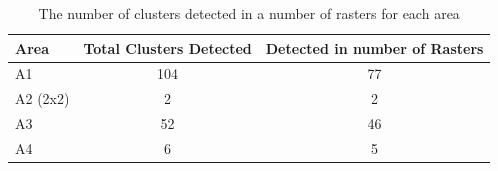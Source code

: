 

\begin{table}[H]
    \centering
    \begin{tabular}{l c c }
        \toprule
        Area     & Total Clusters Detected & Detected in number of Rasters \\
        \midrule
        A1       & 104                     & 77                            \\
        A2 (2x2) & 2                       & 2                             \\
        A3       & 52                      & 46                            \\
        A4       & 6                       & 5                             \\
        \bottomrule
    \end{tabular}
    \caption{The number of clusters detected in a number of rasters for each area}
    \label{tb:clusters-detected-areas}
\end{table}


